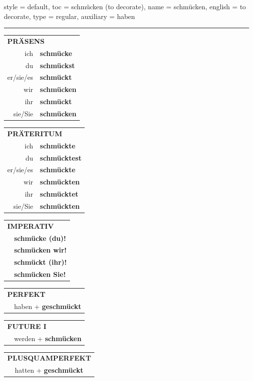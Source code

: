 \begin{verbentry}{
  style = {default},
  toc = {schmücken (to decorate)},
  name = {schmücken},
  english = {to decorate},
  type = {regular},
  auxiliary = {haben}
}


\vspace{5pt}
\hrule
\vspace{5pt}

\begin{tabular}{rl}
\multicolumn{2}{l}{\textbf{PRÄSENS}}\\
ich & \textbf{schmücke}\\
du & \textbf{schmückst}\\
er/sie/es & \textbf{schmückt}\\
wir & \textbf{schmücken}\\
ihr & \textbf{schmückt}\\
sie/Sie & \textbf{schmücken}\\
\end{tabular}
\hfill
\begin{tabular}{rl}
\multicolumn{2}{l}{\textbf{PRÄTERITUM}}\\
ich & \textbf{schmückte}\\
du & \textbf{schmücktest}\\
er/sie/es & \textbf{schmückte}\\
wir & \textbf{schmückten}\\
ihr & \textbf{schmücktet}\\
sie/Sie & \textbf{schmückten}\\
\end{tabular}
\hfill
\begin{tabular}{rl}
\multicolumn{2}{l}{\textbf{IMPERATIV}}\\
& \textbf{schmücke (du)!}\\
& \textbf{schmücken wir!}\\
& \textbf{schmückt (ihr)!}\\
& \textbf{schmücken Sie!}\\
\end{tabular}

\vspace{10pt}

\begin{tabular}{rl}
\multicolumn{2}{l}{\textbf{PERFEKT}}\\
& haben + \textbf{geschmückt}\\
\end{tabular}
\hfill
\begin{tabular}{rl}
\multicolumn{2}{l}{\textbf{FUTURE I}}\\
& werden + \textbf{schmücken}\\
\end{tabular}
\hfill
\begin{tabular}{rl}
\multicolumn{2}{l}{\textbf{PLUSQUAMPERFEKT}}\\
& hatten + \textbf{geschmückt}\\
\end{tabular}


\end{verbentry}
